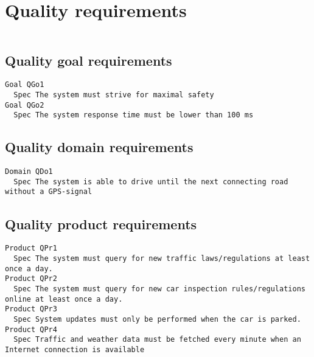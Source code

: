         
       \section{Quality requirements}


\begin{lstlisting}

\end{lstlisting}


       \subsection{Quality goal requirements}


\begin{lstlisting}
Goal QGo1
  Spec The system must strive for maximal safety
Goal QGo2
  Spec The system response time must be lower than 100 ms

\end{lstlisting}
    
        
       \subsection{Quality domain requirements}


\begin{lstlisting}
Domain QDo1
  Spec The system is able to drive until the next connecting road without a GPS-signal

\end{lstlisting}
    
        
       \subsection{Quality product requirements}


\begin{lstlisting}
Product QPr1
  Spec The system must query for new traffic laws/regulations at least once a day.
Product QPr2
  Spec The system must query for new car inspection rules/regulations online at least once a day.
Product QPr3
  Spec System updates must only be performed when the car is parked.
Product QPr4
  Spec Traffic and weather data must be fetched every minute when an Internet connection is available

\end{lstlisting}